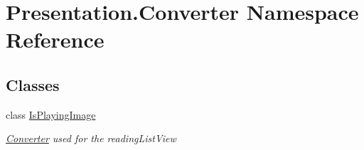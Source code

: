 \hypertarget{namespace_presentation_1_1_converter}{}\section{Presentation.\+Converter Namespace Reference}
\label{namespace_presentation_1_1_converter}
\subsection*{Classes}
\begin{DoxyCompactItemize}
\item 
class \hyperlink{class_presentation_1_1_converter_1_1_is_playing_image}{Is\+Playing\+Image}
\begin{DoxyCompactList}\small\item\em \hyperlink{namespace_presentation_1_1_converter}{Converter} used for the reading\+List\+View \end{DoxyCompactList}\end{DoxyCompactItemize}
